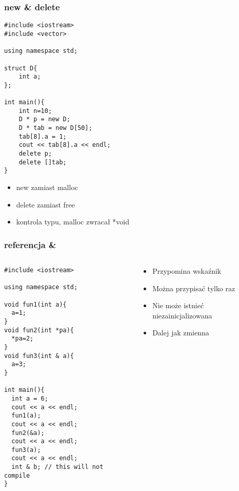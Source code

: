 \documentclass[10pt]{beamer}
\begin{document}
\begin{frame}[fragile]
  \frametitle{new \& delete}
\begin{lstlisting}
#include <iostream>
#include <vector>

using namespace std;

struct D{
    int a;
};

int main(){
    int n=10;
    D * p = new D;
    D * tab = new D[50];
    tab[8].a = 1;
    cout << tab[8].a << endl;
    delete p;
    delete []tab;
}
\end{lstlisting}

\begin{itemize}
  \item new zamiast malloc
  \item delete zamiast free
  \item kontrola typu, malloc zwracał *void
\end{itemize}

\end{frame}

\begin{frame}[fragile]
  \frametitle{referencja \&}
  \begin{columns}
    \begin{column}{0.48\textwidth}
      \begin{lstlisting}
#include <iostream>

using namespace std;

void fun1(int a){
  a=1;
}
void fun2(int *pa){
  *pa=2;
}
void fun3(int & a){
  a=3;
}

int main(){
  int a = 6;
  cout << a << endl;
  fun1(a);
  cout << a << endl;
  fun2(&a);
  cout << a << endl;
  fun3(a);
  cout << a << endl;
  int & b; // this will not compile
}
\end{lstlisting}
    \end{column}
    \begin{column}{0.48\textwidth}
      \begin{itemize}
        \item Przypomina wskaźnik
        \item Można przypisać tylko raz
        \item Nie może istnieć niezainicjalizowana
        \item Dalej jak zmienna
      \end{itemize}
    \end{column}
  \end{columns}
\end{frame}
\end{document}
